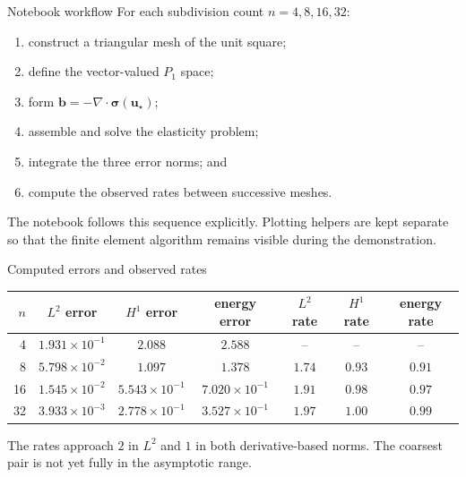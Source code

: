 \documentclass[11pt,aspectratio=169]{beamer}
\newcommand{\divg}{\nabla\!\cdot}
\newcommand{\bu}{\bm u}
\newcommand{\bsig}{\bm\sigma}
\begin{document}
\begin{frame}{Notebook workflow}
For each subdivision count $n=4,8,16,32$:
\begin{enumerate}
  \item construct a triangular mesh of the unit square;
  \item define the vector-valued $P_1$ space;
  \item form $\bm b=-\divg\bsig(\bu_\star)$;
  \item assemble and solve the elasticity problem;
  \item integrate the three error norms; and
  \item compute the observed rates between successive meshes.
\end{enumerate}
\vspace{0.3cm}

The notebook follows this sequence explicitly. Plotting helpers are kept
separate so that the finite element algorithm remains visible during the
demonstration.
\end{frame}

\begin{frame}{Computed errors and observed rates}
\centering
\small
\renewcommand{\arraystretch}{1.25}
\begin{tabular}{rccc|ccc}
  \toprule
  $n$ & $L^2$ error & $H^1$ error & energy error
      & $L^2$ rate & $H^1$ rate & energy rate\\
  \midrule
   4 & $1.931\!\times\!10^{-1}$ & $2.088$ & $2.588$ & -- & -- & --\\
   8 & $5.798\!\times\!10^{-2}$ & $1.097$ & $1.378$ & $1.74$ & $0.93$ & $0.91$\\
  16 & $1.545\!\times\!10^{-2}$ & $5.543\!\times\!10^{-1}$ & $7.020\!\times\!10^{-1}$
     & $1.91$ & $0.98$ & $0.97$\\
  32 & $3.933\!\times\!10^{-3}$ & $2.778\!\times\!10^{-1}$ & $3.527\!\times\!10^{-1}$
     & $1.97$ & $1.00$ & $0.99$\\
  \bottomrule
\end{tabular}
\vspace{0.45cm}

\raggedright
The rates approach $2$ in $L^2$ and $1$ in both derivative-based norms.
The coarsest pair is not yet fully in the asymptotic range.
\end{frame}
\end{document}
